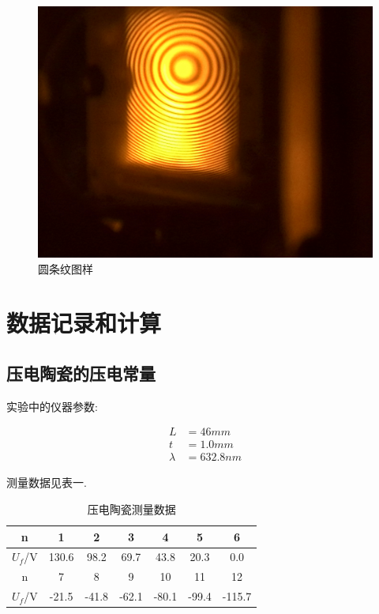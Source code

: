 \documentclass[a4paper,10pt,notitlepage]{article}
\begin{document}
\begin{figure}
\centering
	\includegraphics[scale=0.075]{f2.jpg}
	\caption{圆条纹图样}
\end{figure}

\section{数据记录和计算}

\subsection{压电陶瓷的压电常量}

	实验中的仪器参数:
	
\begin{align*}
	L &= 46mm \\
	t &= 1.0mm \\
	\lambda &= 632.8nm
\end{align*}

	测量数据见表一.

\begin{center}

	\begin{longtable}{|c|c|c|c|c|c|c|}
	\caption{压电陶瓷测量数据} \\
	\hline
	n & 1 & 2 & 3 & 4 & 5 & 6 \\
	\hline
	$U_f$/V & 130.6 & 98.2 & 69.7 & 43.8 & 20.3 & 0.0 \\
	\hline
	\hline
	n & 7 & 8 & 9 & 10 & 11 & 12 \\
	\hline
	$U_f$/V & -21.5 & -41.8 & -62.1 & -80.1 & -99.4 & -115.7 \\
	\hline
	\end{longtable}

\end{center}
\end{document}

